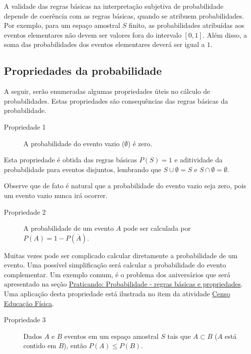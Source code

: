 A validade das regras básicas na interpretação subjetiva de probabilidade depende de coerência com as regras básicas, quando se atribuem probabilidades. Por exemplo, para um espaço amostral \(S\) finito, as probabilidades atribuídas aos eventos elementares não devem ser valores fora do intervalo \([0,1]\). Além disso, a soma das probabilidades dos eventos elementares deverá ser igual a $1$.


\subsection{Propriedades da probabilidade}

A seguir, serão enumeradas algumas propriedades úteis no cálculo de probabilidades. Estas propriedades são consequências das regras básicas da probabilidade.

\begin{description}
\item[Propriedade 1]
A probabilidade do evento vazio (\(\emptyset\)) é zero.
\end{description}

Esta propriedade é obtida das regras básicas \(P(S)=1\) e aditividade da probabilidade para eventos disjuntos, lembrando que \(S\cup \emptyset =S\) e \(S\cap \emptyset =\emptyset\).

Observe que de fato é natural que a probabilidade do evento vazio seja zero, pois um evento vazio nunca irá ocorrer.

\begin{description}
\item[Propriedade 2] A probabilidade de um evento \(A\) pode ser calculada por \(P({A})= 1-P(\overline{A})\).
\end{description}

Muitas vezes pode ser complicado calcular diretamente a probabilidade de um evento. Uma possível simplificação será calcular a probabilidade do evento complementar. Um exemplo comum, é o problema dos aniversários que será apresentado na seção \hyperref[regrasbasicaspropriedades]{Praticando: Probabilidade - regras básicas e propriedades}. Uma aplicação desta propriedade está ilustrada no item  da atividade \hyperref[censo-educacao-fisica]{Censo Educação Física}.

\begin{description}
\item[Propriedade 3] Dados \(A\) e \(B\) eventos em um espaço amostral \(S\) tais que \(A\subset B\) (\(A\) está contido em \(B\)), então \(P(A)\leq P(B)\).
\end{description}

